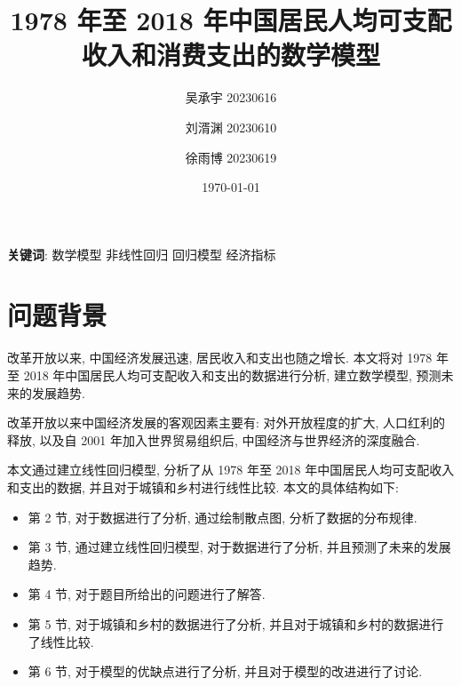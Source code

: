 \documentclass{article}
\title{1978 年至 2018 年中国居民人均可支配收入和消费支出的数学模型}
\author{吴承宇 20230616 \and 刘湑渊 20230610 \and 徐雨博 20230619}
\date{\today}
\begin{document}
\maketitle
{}
\textbf{关键词}: 数学模型 \quad 非线性回归 \quad 回归模型 \quad 经济指标

\newpage

\section{问题背景}
\par 改革开放以来, 中国经济发展迅速, 居民收入和支出也随之增长. 本文将对 1978 年至 2018 年中国居民人均可支配收入和支出的数据进行分析, 建立数学模型, 预测未来的发展趋势.\\
\par 改革开放以来中国经济发展的客观因素主要有: 对外开放程度的扩大, 人口红利的释放, 以及自 2001 年加入世界贸易组织后, 中国经济与世界经济的深度融合.\\
\par 本文通过建立线性回归模型, 分析了从 1978 年至 2018 年中国居民人均可支配收入和支出的数据, 并且对于城镇和乡村进行线性比较. 本文的具体结构如下:
\begin{itemize}
    \item 第 2 节, 对于数据进行了分析, 通过绘制散点图, 分析了数据的分布规律.
    \item 第 3 节, 通过建立线性回归模型, 对于数据进行了分析, 并且预测了未来的发展趋势.
    \item 第 4 节, 对于题目所给出的问题进行了解答.
    \item 第 5 节, 对于城镇和乡村的数据进行了分析, 并且对于城镇和乡村的数据进行了线性比较.
    \item 第 6 节, 对于模型的优缺点进行了分析, 并且对于模型的改进进行了讨论.
\end{itemize}
\end{document}
